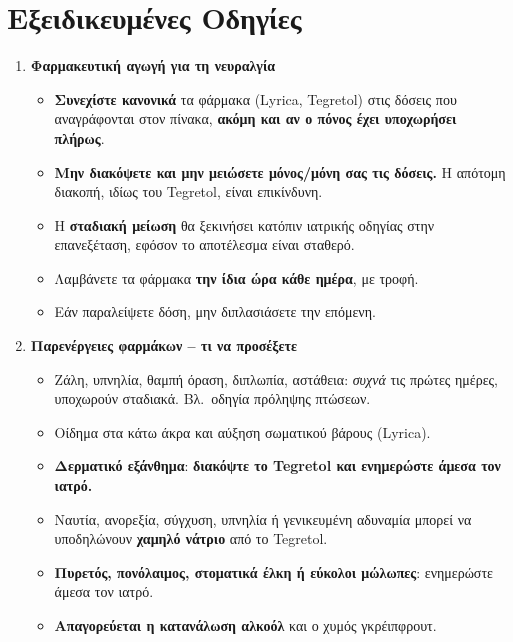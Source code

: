 \documentclass[10pt,greek]{article}
\begin{document}
\newpage
\section*{Εξειδικευμένες Οδηγίες}
\begin{enumerate}[label=\arabic*.]
  \item \textbf{Φαρμακευτική αγωγή για τη νευραλγία}
      \begin{itemize}
\item \textbf{Συνεχίστε κανονικά} τα φάρμακα (Lyrica, Tegretol) στις δόσεις που αναγράφονται στον πίνακα, \textbf{ακόμη και αν ο πόνος έχει υποχωρήσει πλήρως}.
\item \textbf{Μην διακόψετε και μην μειώσετε μόνος/μόνη σας τις δόσεις.} Η απότομη διακοπή, ιδίως του Tegretol, είναι επικίνδυνη.
\item Η \textbf{σταδιακή μείωση} θα ξεκινήσει κατόπιν ιατρικής οδηγίας στην επανεξέταση, εφόσον το αποτέλεσμα είναι σταθερό.
\item Λαμβάνετε τα φάρμακα \textbf{την ίδια ώρα κάθε ημέρα}, με τροφή.
\item Εάν παραλείψετε δόση, μην διπλασιάσετε την επόμενη.
    \end{itemize}
  \item \textbf{Παρενέργειες φαρμάκων -- τι να προσέξετε}
      \begin{itemize}
\item Ζάλη, υπνηλία, θαμπή όραση, διπλωπία, αστάθεια: \emph{συχνά} τις πρώτες ημέρες, υποχωρούν σταδιακά. Βλ.\ οδηγία πρόληψης πτώσεων.
\item Οίδημα στα κάτω άκρα και αύξηση σωματικού βάρους (Lyrica).
\item \textbf{Δερματικό εξάνθημα}: \textbf{διακόψτε το Tegretol και ενημερώστε άμεσα τον ιατρό.}
\item Ναυτία, ανορεξία, σύγχυση, υπνηλία ή γενικευμένη αδυναμία μπορεί να υποδηλώνουν \textbf{χαμηλό νάτριο} από το Tegretol.
\item \textbf{Πυρετός, πονόλαιμος, στοματικά έλκη ή εύκολοι μώλωπες}: ενημερώστε άμεσα τον ιατρό.
\item \textbf{Απαγορεύεται η κατανάλωση αλκοόλ} και ο χυμός γκρέιπφρουτ.
    \end{itemize}

\end{enumerate}
\end{document}
